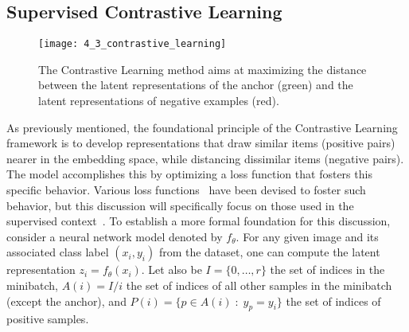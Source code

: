 \subsection{Supervised Contrastive Learning}
\begin{figure}
    \centering
    \texttt{[image: 4\_3\_contrastive\_learning]}
    \caption[Contrastive Learning]{The Contrastive Learning method aims at
    maximizing the distance between the latent representations of the anchor
    (green) and the latent representations of negative examples (red).}
\end{figure}
As previously mentioned, the foundational principle of the Contrastive
Learning~\cite{hadsell_dimred_2005, chen_self_contrastive_2020,
khosla_supervised_contrastive_2021, henaff_contrastive_2020,
hjelm_contrastive_2019, wu_unsupervised_2018} framework is to develop
representations that draw similar items (positive pairs) nearer in the embedding
space, while distancing dissimilar items (negative pairs). The model
accomplishes this by optimizing a loss function that fosters this specific
behavior. Various loss functions~\cite{schroff_facenet_2015, sohn_improved_2016} have been devised
to foster such behavior, but this discussion will specifically focus on those
used in the supervised context~. To
establish a more formal foundation for this discussion, consider a neural
network model denoted by $f_\theta$. For any given image and its associated
class label $(x_i, y_i)$ from the dataset, one can compute the latent
representation
$z_i = f_\theta(x_i)$. Let also be $I = \{0, \dots, r\}$ the set of indices in
the minibatch, $A(i) = I / i$ the set of indices of all other samples in the
minibatch (except the anchor), and $P(i) = \{p \in A(i) \; : \; y_p = y_i \}$
the set of indices of positive samples.

